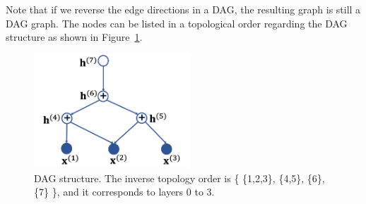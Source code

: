 \documentclass[twoside]{article}
\begin{document}
Note that if we reverse the edge directions in a DAG, the resulting graph is still a DAG graph.  
The nodes can be listed in a topological order regarding the DAG structure as shown in Figure~\ref{fig:dag}. 
\begin{figure}[H]
    \centering
    \includegraphics[width=2.3in]{fig/dag.png}
    \caption{DAG structure. The inverse topology order is \big\{ \{1,2,3\}, \{4,5\}, \{6\},  \{7\} \big\}, and it corresponds to layers 0 to 3.  }
    \label{fig:dag}
\end{figure}
\end{document}
